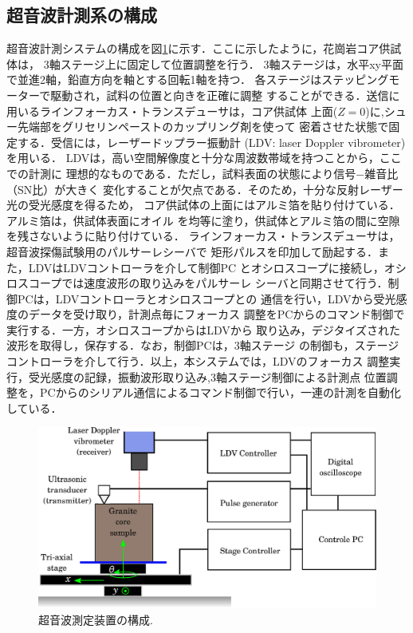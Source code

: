 \subsection{超音波計測系の構成}
超音波計測システムの構成を図\ref{fig:fig3}に示す．ここに示したように，花崗岩コア供試体は，
3軸ステージ上に固定して位置調整を行う．
3軸ステージは，水平xy平面で並進2軸，鉛直方向を軸とする回転1軸を持つ．
各ステージはステッピングモーターで駆動され，試料の位置と向きを正確に調整
することができる．送信に用いるラインフォーカス・トランスデューサは，コア供試体
上面($Z=0$)に,シュー先端部をグリセリンペーストのカップリング剤を使って
密着させた状態で固定する．受信には，レーザードップラー振動計
(LDV: laser Doppler vibrometer)を用いる．
LDVは，高い空間解像度と十分な周波数帯域を持つことから，ここでの計測に
理想的なものである．ただし，試料表面の状態により信号−雑音比（SN比）が大きく
変化することが欠点である．そのため，十分な反射レーザー光の受光感度を得るため，
コア供試体の上面にはアルミ箔を貼り付けている．アルミ箔は，供試体表面にオイル
を均等に塗り，供試体とアルミ箔の間に空隙を残さないように貼り付けている．
ラインフォーカス・トランスデューサは，超音波探傷試験用のパルサーレシーバで
矩形パルスを印加して励起する．また，LDVはLDVコントローラを介して制御PC
とオシロスコープに接続し，オシロスコープでは速度波形の取り込みをパルサーレ
シーバと同期させて行う．制御PCは，LDVコントローラとオシロスコープとの
通信を行い，LDVから受光感度のデータを受け取り，計測点毎にフォーカス
調整をPCからのコマンド制御で実行する．一方，オシロスコープからはLDVから
取り込み，デジタイズされた波形を取得し，保存する．なお，制御PCは，3軸ステージ
の制御も，ステージコントローラを介して行う．以上，本システムでは，LDVのフォーカス
調整実行，受光感度の記録，振動波形取り込み,3軸ステージ制御による計測点
位置調整を，PCからのシリアル通信によるコマンド制御で行い，一連の計測を自動化
している．
\begin{figure}[h]
	\begin{center}
	\includegraphics[width=0.8\linewidth]{Figs/fig3.eps} 
	\end{center}
	\caption{
		超音波測定装置の構成.
	} 
	\label{fig:fig3}
\end{figure}

